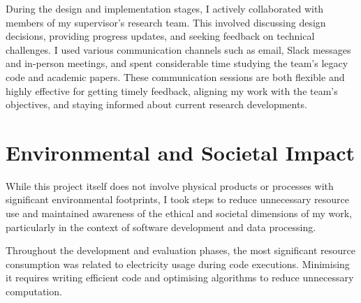 During the design and implementation stages, I actively collaborated with members of my supervisor's research team. This involved discussing design decisions, providing progress updates, and seeking feedback on technical challenges. I used various communication channels such as email, Slack messages and in-person meetings, and spent considerable time studying the team's legacy code and academic papers. These communication sessions are both flexible and highly effective for getting timely feedback, aligning my work with the team's objectives, and staying informed about current research developments.




%
%

\section{Environmental and Societal Impact}

While this project itself does not involve physical products or processes with significant environmental footprints, I took steps to reduce unnecessary resource use and maintained awareness of the ethical and societal dimensions of my work, particularly in the context of software development and data processing.

Throughout the development and evaluation phases, the most significant resource consumption was related to electricity usage during code executions. Minimising it requires writing efficient code and optimising algorithms to reduce unnecessary computation. 

